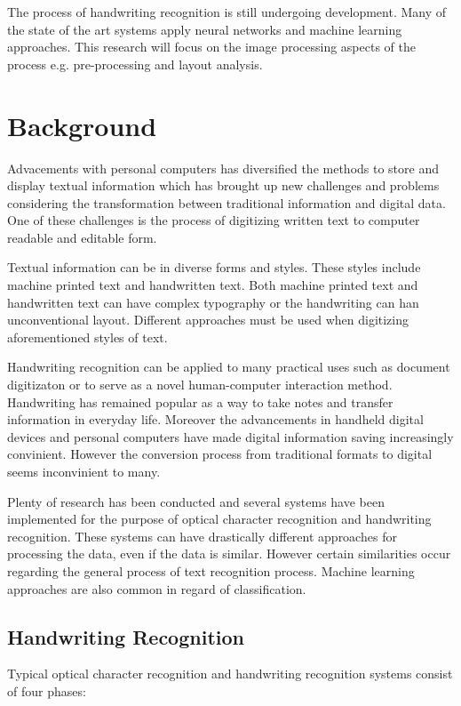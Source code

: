 \documentclass{article}
\begin{document}
    The process of handwriting recognition is still undergoing development. Many of the state of the art systems apply neural networks and machine learning approaches. This research will focus on the image processing aspects of the process e.g. pre-processing and layout analysis.

  \newpage
  \section{Background}
    Advacements with personal computers has diversified the methods to store and display textual information which has brought up new challenges and problems considering the transformation between traditional information and digital data. One of these challenges is the process of digitizing written text to computer readable and editable form.

    Textual information can be in diverse forms and styles. These styles include machine printed text and handwritten text. Both machine printed text and handwritten text can have complex typography or the handwriting can han unconventional layout. Different approaches must be used when digitizing aforementioned styles of text.

    Handwriting recognition can be applied to many practical uses such as document digitizaton or to serve as a novel human-computer interaction method. Handwriting has remained popular as a way to take notes and transfer information in everyday life. Moreover the advancements in handheld digital devices and personal computers have made digital information saving increasingly convinient. However the conversion process from traditional formats to digital seems inconvinient to many.

    Plenty of research has been conducted and several systems have been implemented for the purpose of optical character recognition and handwriting recognition. These systems can have drastically different approaches for processing the data, even if the data is similar. However certain similarities occur regarding the general process of text recognition process. Machine learning approaches are also common in regard of classification.



  \subsection{Handwriting Recognition}

    Typical optical character recognition and handwriting recognition systems consist of four phases:
\end{document}
